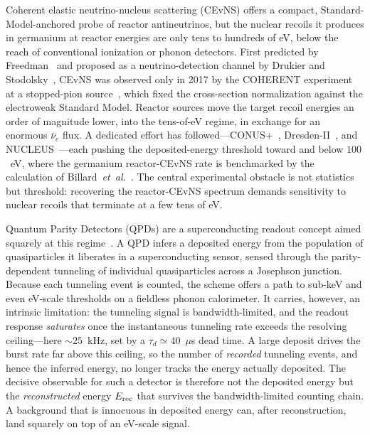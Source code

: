 Coherent elastic neutrino-nucleus scattering (CEvNS) offers a compact, Standard-Model-anchored probe of reactor antineutrinos, but the nuclear recoils it produces in germanium at reactor energies are only tens to hundreds of eV, below the reach of conventional ionization or phonon detectors. First predicted by Freedman~\cite{freedman1974} and proposed as a neutrino-detection channel by Drukier and Stodolsky~\cite{drukier1984}, CEvNS was observed only in 2017 by the COHERENT experiment at a stopped-pion source~\cite{akimov2017}, which fixed the cross-section normalization against the electroweak Standard Model. Reactor sources move the target recoil energies an order of magnitude lower, into the tens-of-eV regime, in exchange for an enormous $\bar\nu_e$ flux. A dedicated effort has followed---CONUS+~\cite{conus2025}, Dresden-II~\cite{dresden2022}, and NUCLEUS~\cite{nucleus}---each pushing the deposited-energy threshold toward and below $100$~eV, where the germanium reactor-CEvNS rate is benchmarked by the calculation of Billard~\emph{et~al.}~\cite{billard2017}. The central experimental obstacle is not statistics but threshold: recovering the reactor-CEvNS spectrum demands sensitivity to nuclear recoils that terminate at a few tens of eV.

Quantum Parity Detectors (QPDs) are a superconducting readout concept aimed squarely at this regime~\cite{ramanathan2026}. A QPD infers a deposited energy from the population of quasiparticles it liberates in a superconducting sensor, sensed through the parity-dependent tunneling of individual quasiparticles across a Josephson junction. Because each tunneling event is counted, the scheme offers a path to sub-keV and even eV-scale thresholds on a fieldless phonon calorimeter. It carries, however, an intrinsic limitation: the tunneling signal is bandwidth-limited, and the readout response \emph{saturates} once the instantaneous tunneling rate exceeds the resolving ceiling---here $\sim$$25$~kHz, set by a $\tau_d\simeq40$~$\mu$s dead time. A large deposit drives the burst rate far above this ceiling, so the number of \emph{recorded} tunneling events, and hence the inferred energy, no longer tracks the energy actually deposited. The decisive observable for such a detector is therefore not the deposited energy but the \emph{reconstructed} energy $E_{\rm rec}$ that survives the bandwidth-limited counting chain. A background that is innocuous in deposited energy can, after reconstruction, land squarely on top of an eV-scale signal.

